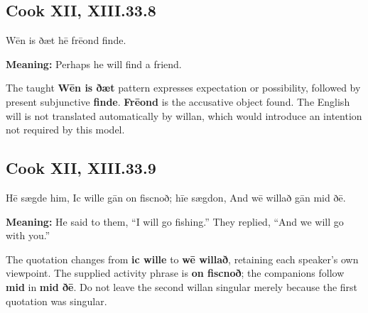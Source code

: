 \par\begin{minipage}{\linewidth}\raggedright
\subsection*{Cook XII, XIII.33.8}

Wēn is ðæt hē frēond finde.

\textbf{Meaning:} Perhaps he will find a friend.

The taught \textbf{Wēn is ðæt} pattern expresses expectation or possibility, followed by present subjunctive \textbf{finde}. \textbf{Frēond} is the accusative object found. The English will is not translated automatically by willan, which would introduce an intention not required by this model.

\end{minipage}\par\addvspace{4pt}

\par\begin{minipage}{\linewidth}\raggedright
\subsection*{Cook XII, XIII.33.9}

Hē sægde him, Ic wille gān on fiscnoð; hīe sægdon, And wē willað gān mid ðē.

\textbf{Meaning:} He said to them, “I will go fishing.” They replied, “And we will go with you.”

The quotation changes from \textbf{ic wille} to \textbf{wē willað}, retaining each speaker’s own viewpoint. The supplied activity phrase is \textbf{on fiscnoð}; the companions follow \textbf{mid} in \textbf{mid ðē}. Do not leave the second willan singular merely because the first quotation was singular.

\end{minipage}\par\addvspace{4pt}

